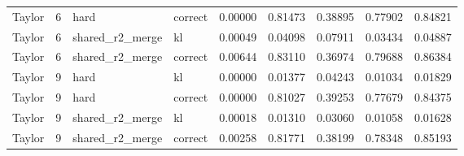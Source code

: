 \begin{tabular}{lrllrrrrr}
Taylor & 6 & hard & correct & 0.00000 & 0.81473 & 0.38895 & 0.77902 & 0.84821 \\
Taylor & 6 & shared_r2_merge & kl & 0.00049 & 0.04098 & 0.07911 & 0.03434 & 0.04887 \\
Taylor & 6 & shared_r2_merge & correct & 0.00644 & 0.83110 & 0.36974 & 0.79688 & 0.86384 \\
Taylor & 9 & hard & kl & 0.00000 & 0.01377 & 0.04243 & 0.01034 & 0.01829 \\
Taylor & 9 & hard & correct & 0.00000 & 0.81027 & 0.39253 & 0.77679 & 0.84375 \\
Taylor & 9 & shared_r2_merge & kl & 0.00018 & 0.01310 & 0.03060 & 0.01058 & 0.01628 \\
Taylor & 9 & shared_r2_merge & correct & 0.00258 & 0.81771 & 0.38199 & 0.78348 & 0.85193 \\
\bottomrule
\end{tabular}
